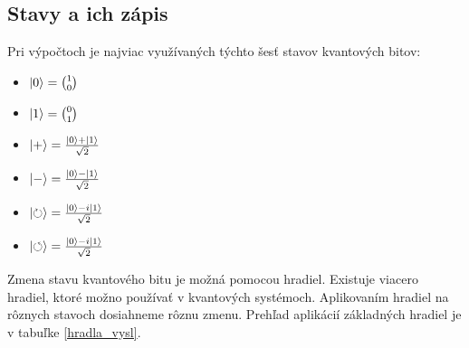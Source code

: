 \subsection{Stavy a ich zápis}

Pri výpočtoch je najviac využívaných týchto šesť stavov kvantových bitov:
\begin{itemize}
\item[] \(\Ket{0} = \binom{1}{0}\)
\item[] \(\Ket{1} = \binom{0}{1}\)
\item[] \(\Ket{+} = \frac{\Ket{0} + \Ket{1}}{\sqrt{2}}\)
\item[] \(\Ket{-} = \frac{\Ket{0} - \Ket{1}}{\sqrt{2}}\)
\item[] \(\Ket{\circlearrowright} = \frac{\Ket{0} - i\Ket{1}}{\sqrt{2}}\)
\item[] \(\Ket{\circlearrowleft} = \frac{\Ket{0} - i\Ket{1}}{\sqrt{2}}\)
\end{itemize}

Zmena stavu kvantového bitu je možná pomocou hradiel. Existuje viacero
hradiel, ktoré možno používať v kvantových systémoch. Aplikovaním hradiel
na rôznych stavoch dosiahneme rôznu zmenu. Prehľad aplikácií základných 
hradiel je v tabuľke \ref{hradla_vysl}.

